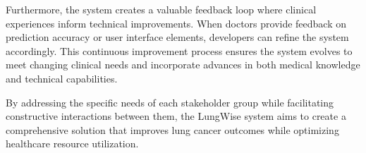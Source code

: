 Furthermore, the system creates a valuable feedback loop where clinical experiences inform technical improvements. When doctors provide feedback on prediction accuracy or user interface elements, developers can refine the system accordingly. This continuous improvement process ensures the system evolves to meet changing clinical needs and incorporate advances in both medical knowledge and technical capabilities.

By addressing the specific needs of each stakeholder group while facilitating constructive interactions between them, the LungWise system aims to create a comprehensive solution that improves lung cancer outcomes while optimizing healthcare resource utilization.
